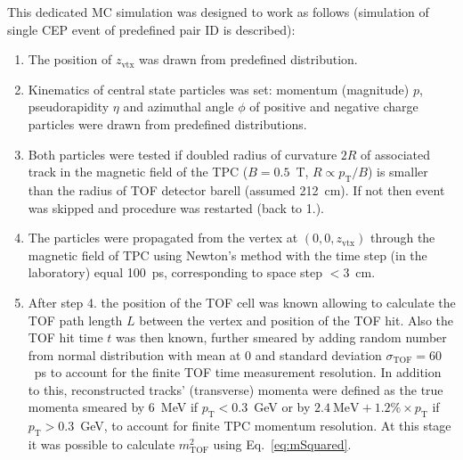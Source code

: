 This dedicated MC simulation was designed to work as follows (simulation of single CEP event of predefined pair ID is described):
\begin{enumerate}
 \item The position of $z_{\text{vtx}}$ was drawn from predefined distribution.
 \item Kinematics of central state particles was set: momentum (magnitude) $p$, pseudorapidity $\eta$ and azimuthal angle $\phi$ of positive and negative charge particles were drawn from predefined distributions.
 \item Both particles were tested if doubled radius of curvature $2R$ of associated track in the magnetic field of the TPC ($B=0.5$~T, $R \propto p_{\text{T}}/B$) is smaller than the radius of TOF detector barell (assumed 212~cm). If not then event was skipped and procedure was restarted (back to 1.).
 \item The particles were propagated from the vertex at $(0,0,z_{\text{vtx}})$ through the magnetic field of TPC using Newton's method with the time step (in the laboratory) equal 100~ps, corresponding to space step $<3$~cm.
 \item After step 4. the position of the TOF cell was known allowing to calculate the TOF path length $L$ between the vertex and position of the TOF hit. Also the TOF hit time $t$ was then known, further smeared by adding random number from normal distribution with mean at 0 and standard deviation $\sigma_{\text{TOF}}=60$~ps to account for the finite TOF time measurement resolution. In addition to this, reconstructed tracks' (transverse) momenta were defined as the true momenta smeared by 6~MeV if $p_{\text{T}}<0.3$~GeV or by $2.4~\text{MeV} + 1.2\%\times p_{\text{T}}$ if $p_{\text{T}}>0.3$~GeV, to account for finite TPC momentum resolution. At this stage it was possible to calculate $m^{2}_{\text{TOF}}$ using Eq.~\eqref{eq:mSquared}.

\end{enumerate}
